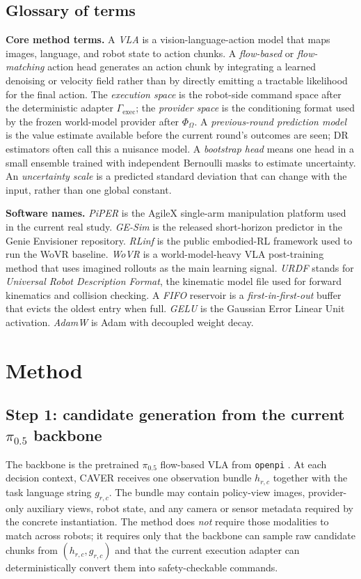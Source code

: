 \documentclass[10pt]{article}
\theoremstyle{plain}
\theoremstyle{definition}
\theoremstyle{remark}
\begin{document}
\subsection{Glossary of terms}
\textbf{Core method terms.} A \emph{VLA} is a vision-language-action model that maps images, language, and robot state to action chunks. A \emph{flow-based} or \emph{flow-matching} action head generates an action chunk by integrating a learned denoising or velocity field rather than by directly emitting a tractable likelihood for the final action. The \emph{execution space} is the robot-side command space after the deterministic adapter $\Gamma_{\mathrm{exec}}$; the \emph{provider space} is the conditioning format used by the frozen world-model provider after $\Phi_{\Omega}$. A \emph{previous-round prediction model} is the value estimate available before the current round's outcomes are seen; DR estimators often call this a nuisance model. A \emph{bootstrap head} means one head in a small ensemble trained with independent Bernoulli masks to estimate uncertainty. An \emph{uncertainty scale} is a predicted standard deviation that can change with the input, rather than one global constant.

\textbf{Software names.} \emph{PiPER} is the AgileX single-arm manipulation platform used in the current real study. \emph{GE-Sim} is the released short-horizon predictor in the Genie Envisioner repository. \emph{RLinf} is the public embodied-RL framework used to run the WoVR baseline. \emph{WoVR} is a world-model-heavy VLA post-training method that uses imagined rollouts as the main learning signal. \emph{URDF} stands for \emph{Universal Robot Description Format}, the kinematic model file used for forward kinematics and collision checking. A \emph{FIFO} reservoir is a \emph{first-in-first-out} buffer that evicts the oldest entry when full. \emph{GELU} is the Gaussian Error Linear Unit activation. \emph{AdamW} is Adam with decoupled weight decay.

\section{Method}

\subsection{Step 1: candidate generation from the current \texorpdfstring{$\pi_{0.5}$}{pi0.5} backbone}
The backbone is the pretrained $\pi_{0.5}$ flow-based VLA from \texttt{openpi} \citep{pi052025,openpi2026repo}. At each decision context, CAVER receives one observation bundle $h_{r,c}$ together with the task language string $g_{r,c}$. The bundle may contain policy-view images, provider-only auxiliary views, robot state, and any camera or sensor metadata required by the concrete instantiation. The method does \emph{not} require those modalities to match across robots; it requires only that the backbone can sample raw candidate chunks from $(h_{r,c},g_{r,c})$ and that the current execution adapter can deterministically convert them into safety-checkable commands.
\end{document}
